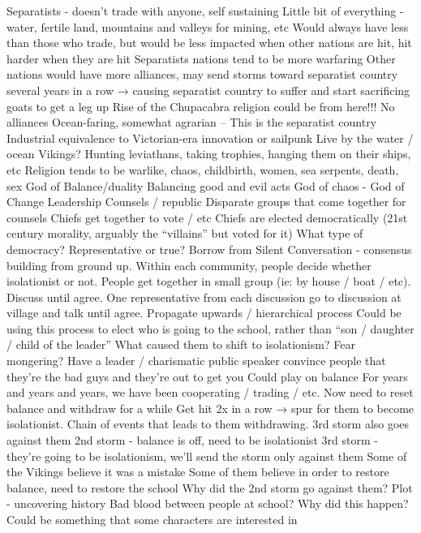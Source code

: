 \documentclass[blue]{GL2020}
\begin{document}
Separatists - doesn’t trade with anyone, self sustaining
Little bit of everything - water, fertile land, mountains and valleys for mining, etc
Would always have less than those who trade, but would be less impacted when other nations are hit, hit harder when they are hit
Separatists nations tend to be more warfaring
Other nations would have more alliances, may send storms toward separatist country several years in a row → causing separatist country to suffer and start sacrificing goats to get a leg up
Rise of the Chupacabra religion could be from here!!! No alliances
Ocean-faring, somewhat agrarian -- This is the separatist country
Industrial equivalence to Victorian-era innovation or sailpunk
Live by the water / ocean
Vikings?  Hunting leviathans, taking trophies, hanging them on their ships, etc
Religion tends to be warlike, chaos, childbirth, women, sea serpents, death, sex
God of Balance/duality
Balancing good and evil acts
God of chaos - God of Change
Leadership
Counsels / republic
Disparate groups that come together for counsels
Chiefs get together to vote / etc
Chiefs are elected democratically (21st century morality, arguably the “villains” but voted for it)
What type of democracy?  Representative or true?
Borrow from Silent Conversation - consensus building from ground up.  Within each community, people decide whether isolationist or not.  People get together in small group (ie: by house / boat / etc).  Discuss until agree.  One representative from each discussion go to discussion at village and talk until agree.  Propagate upwards / hierarchical process
Could be using this process to elect who is going to the school, rather than “son / daughter / child of the leader”
What caused them to shift to isolationism?
Fear mongering?
Have a leader / charismatic public speaker convince people that they’re the bad guys and they’re out to get you
Could play on balance
For years and years and years, we have been cooperating / trading / etc.  Now need to reset balance and withdraw for a while
Get hit 2x in a row → spur for them to become isolationist.  Chain of events that leads to them withdrawing.  3rd storm also goes against them
2nd storm - balance is off, need to be isolationist
3rd storm - they’re going to be isolationism, we’ll send the storm only against them
Some of the Vikings believe it was a mistake
Some of them believe in order to restore balance, need to restore the school
Why did the 2nd storm go against them?
Plot - uncovering history
Bad blood between people at school?
Why did this happen?
Could be something that some characters are interested in
\end{document}
